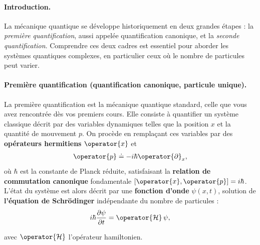 \paragraph{Introduction.}

La mécanique quantique se développe historiquement en deux grandes étapes : la \emph{première quantification}, aussi appelée quantification canonique, et la \emph{seconde quantification}. Comprendre ces deux cadres est essentiel pour aborder les systèmes quantiques complexes, en particulier ceux où le nombre de particules peut varier.




\paragraph{Première quantification (quantification canonique, particule unique).}

La première quantification est la mécanique quantique standard, celle que vous avez rencontrée dès vos premiers cours. Elle consiste à quantifier un système classique décrit par des variables dynamiques telles que la position $x$ et la quantité de mouvement $p$. On procède en remplaçant ces variables par des {\bf opérateurs hermitiens} $\operator{x}$ et %
\begin{eqnarray}
	\operator{p} \doteq -i\hbar \operator{\partial}_x,	\label{chap.1.rapel.1}
\end{eqnarray}
où $\hbar$ est la constante de Planck réduite, satisfaisant la {\bf relation de commutation canonique} fondamentale $[\operator{x}, \operator{p}] = i\hbar$. L’état du système est alors décrit par une {\bf fonction d’onde} $\psi(x,t)$, solution de {\bf l’équation de  Schrödinger} indépendante du nombre de particules :
\begin{eqnarray}
\quad i \hbar \frac{\partial \psi }{\partial t}  &= \operator{\mathcal{H}} \, \psi,\label{chap.1.rapel.2}
\end{eqnarray}

avec $\operator{\mathcal{H}}$ l’opérateur hamiltonien. 

